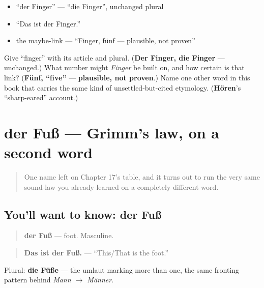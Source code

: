\begin{itemize}
\raggedright
  \item \textquotedblleft{}der Finger\textquotedblright{} — \textquotedblleft{}die Finger\textquotedblright{}, unchanged plural
  \item \textquotedblleft{}Das ist der Finger.\textquotedblright{}
  \item the maybe-link — \textquotedblleft{}Finger, fünf — plausible, not proven\textquotedblright{}
\end{itemize}

\begin{tcolorbox}[breakable,colback=teal!4,colframe=teal!35!black,title={Before you move on}]
Give \textquotedblleft{}finger\textquotedblright{} with its article and plural. (\textbf{Der Finger, die Finger} — unchanged.) What number might \emph{Finger} be built on, and how certain is that link? (\textbf{Fünf, \textquotedblleft{}five\textquotedblright{}} — \textbf{plausible, not proven}.) Name one other word in this book that carries the same kind of unsettled-but-cited etymology. (\textbf{Hören}'s \textquotedblleft{}sharp-eared\textquotedblright{} account.)
\end{tcolorbox}
\section[der Fuß]{der Fuß — Grimm's law, on a second word}

\label{lesson:GE-C31-fuss}



\begin{quote}
One name left on Chapter 17's table, and it turns out to run the very same sound-law you already learned on a completely different word.
\end{quote}

\subsection*{You'll want to know: der Fuß}
\begin{quote}
\textbf{der Fuß} — foot. Masculine.
\end{quote}

\begin{quote}
\textbf{Das ist der Fuß.} — \textquotedblleft{}This/That is the foot.\textquotedblright{}
\end{quote}

Plural: \textbf{die Füße} — the umlaut marking more than one, the same fronting pattern behind \emph{Mann $\to$ Männer}.

